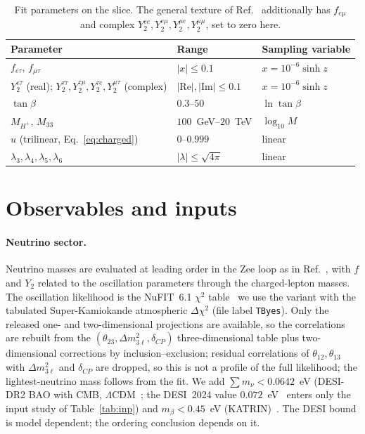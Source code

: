 \documentclass[twocolumn,epjc3]{svjour3}
\newcommand{\HG}{Ref.~\cite{HerreroGarcia:2017xdq}}
\begin{document}
\begin{table}[t]\centering\small
\begin{tabular}{lll}\toprule
Parameter & Range & Sampling variable\\\midrule
$f_{e\tau},\,f_{\mu\tau}$ & $|x|\le0.1$ & $x=10^{-6}\sinh z$\\
$Y_2^{e\tau}$ (real); $Y_2^{\tau\tau},Y_2^{\tau\mu},Y_2^{\tau e},Y_2^{\mu\tau}$ (complex) & $|\mathrm{Re}|,|\mathrm{Im}|\le0.1$ & $x=10^{-6}\sinh z$\\
$\tan\beta$ & $0.3$--$50$ & $\ln\tan\beta$\\
$M_{H^+}$, $M_{33}$ & $100$~GeV--$20$~TeV & $\log_{10}M$\\
$u$ (trilinear, Eq.~\eqref{eq:charged}) & $0$--$0.999$ & linear\\
$\lambda_3,\lambda_4,\lambda_5,\lambda_6$ & $|\lambda|\le\sqrt{4\pi}$ & linear\\\bottomrule
\end{tabular}\caption{Fit parameters on the slice. The general texture of \HG{} additionally has $f_{e\mu}$ and complex $Y_2^{ee},Y_2^{e\mu},Y_2^{\mu e},Y_2^{\mu\mu}$, set to zero here.}\label{tab:pars}\end{table}

\section{Observables and inputs}\label{sec:obs}
\paragraph{Neutrino sector.} Neutrino masses are evaluated at leading order in the Zee loop as in \HG{}, with $f$ and $Y_2$ related to the oscillation parameters through the charged-lepton masses. The oscillation likelihood is the NuFIT~6.1 $\chi^2$ table~\cite{Esteban:2024eli} we use the variant with the tabulated Super-Kamiokande atmospheric $\Delta\chi^2$ (file label \texttt{TByes}). Only the released one- and two-dimensional projections are available, so the correlations are rebuilt from the $(\theta_{23},\Delta m^2_{3\ell},\delta_{CP})$ three-dimensional table plus two-dimensional corrections by inclusion--exclusion; residual correlations of $\theta_{12},\theta_{13}$ with $\Delta m^2_{3\ell}$ and $\delta_{CP}$ are dropped, so this is not a profile of the full likelihood; the lightest-neutrino mass follows from the fit. We add $\sum m_\nu<0.0642$~eV (DESI-DR2 BAO with CMB, $\Lambda$CDM~\cite{Elbers:2025vlz}; the DESI~2024 value $0.072$~eV~\cite{DESI:2024vi} enters only the input study of Table~\ref{tab:inp}) and $m_\beta<0.45$~eV (KATRIN)~\cite{KATRIN:2024cdt}. The DESI bound is model dependent; the ordering conclusion depends on it.
\end{document}
